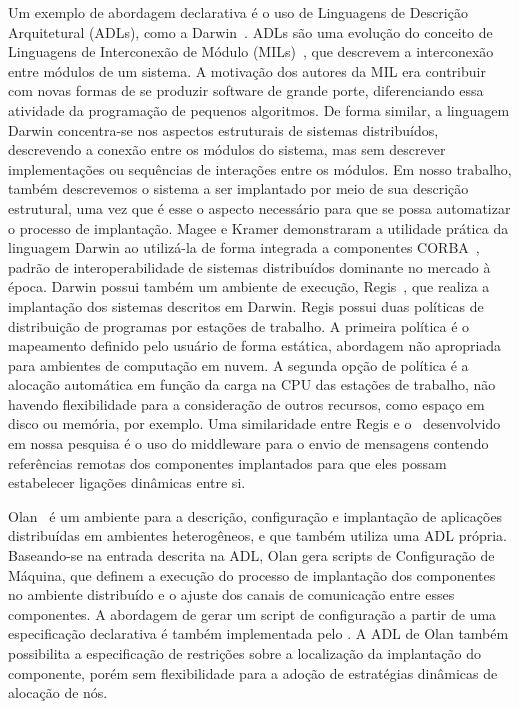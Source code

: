Um exemplo de abordagem declarativa é o uso de Linguagens de Descrição Arquitetural (ADLs), como a Darwin~\cite{Magee1996Dynamic}. ADLs são uma evolução do conceito de Linguagens de Interconexão de Módulo (MILs)~\cite{DeRemer1976Programming}, que descrevem a interconexão entre módulos de um sistema. A motivação dos autores da MIL era contribuir com novas formas de se produzir software de grande porte, diferenciando essa atividade da programação de pequenos algoritmos. De forma similar, a linguagem Darwin concentra-se nos aspectos estruturais de sistemas distribuídos, descrevendo a conexão entre os módulos do sistema, mas sem descrever implementações ou sequências de interações entre os módulos. Em nosso trabalho, também descrevemos o sistema a ser implantado por meio de sua descrição estrutural, uma vez que é esse o aspecto necessário para que se possa automatizar o processo de implantação. Magee e Kramer demonstraram a utilidade prática da linguagem Darwin ao utilizá-la de forma integrada a componentes CORBA~\cite{Magee1997Corba}, padrão de interoperabilidade de sistemas distribuídos dominante no mercado à época. Darwin possui também um ambiente de execução, Regis~\cite{Magee1994Regis}, que realiza a implantação dos sistemas descritos em Darwin. Regis possui duas políticas de distribuição de programas por estações de trabalho. A primeira política é o mapeamento definido pelo usuário de forma estática, abordagem não apropriada para ambientes de computação em nuvem. A segunda opção de política é a alocação automática em função da carga na CPU das estações de trabalho, não havendo flexibilidade para a consideração de outros recursos, como espaço em disco ou memória, por exemplo. Uma similaridade entre Regis e o \ee\ desenvolvido em nossa pesquisa é o uso do middleware para o envio de mensagens contendo referências remotas dos componentes implantados para que eles possam estabelecer ligações dinâmicas entre si.

Olan~\cite{Balter1998Olan} é um ambiente para a descrição, configuração e implantação de aplicações distribuídas em ambientes heterogêneos, e que também utiliza uma ADL própria. Baseando-se na entrada descrita na ADL, Olan gera scripts de Configuração de Máquina, que definem a execução do processo de implantação dos componentes no ambiente distribuído e o ajuste dos canais de comunicação entre esses componentes. A abordagem de gerar um script de configuração a partir de uma especificação declarativa é também implementada pelo \ee. A ADL de Olan também possibilita a especificação de restrições sobre a localização da implantação do componente, porém sem flexibilidade para a adoção de estratégias dinâmicas de alocação de nós.

